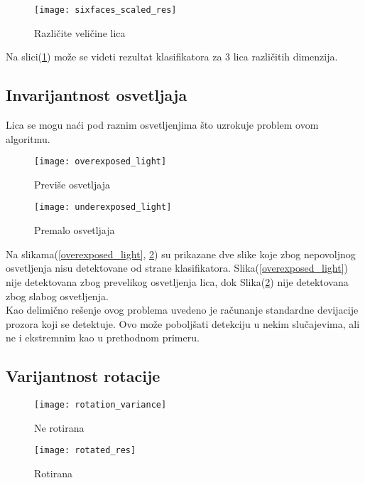 \begin{figure}[h]
  \centering
  \texttt{[image: sixfaces\_scaled\_res]}
  \caption{Različite veličine lica}
  \label{sixfaces_scaled}
\end{figure}

Na slici(\ref{sixfaces_scaled}) može se videti rezultat klasifikatora za 3 lica
različitih dimenzija. \\

\newpage

\subsection{Invarijantnost osvetljaja}\label{lumi_inv_sec}

Lica se mogu naći pod raznim osvetljenjima što uzrokuje problem ovom algoritmu.


\begin{figure}[!htb]
\centering
\parbox{6cm}{
\texttt{[image: overexposed\_light]}
\caption{Previše osvetljaja\cite{CALTECH_DATASET}}
\label{overexposed_light}}
\qquad
\begin{minipage}{6cm}
\texttt{[image: underexposed\_light]}
\caption{Premalo osvetljaja\cite{CALTECH_DATASET}}
\label{underexposed_light}
\end{minipage}
\end{figure}

Na slikama(\ref{overexposed_light}, \ref{underexposed_light}) su prikazane dve
slike koje zbog nepovoljnog osvetljenja nisu detektovane od strane
klasifikatora.
Slika(\ref{overexposed_light}) nije detektovana zbog prevelikog osvetljenja
lica, dok Slika(\ref{underexposed_light}) nije detektovana zbog slabog
osvetljenja.  \\

Kao delimično rešenje ovog problema uvedeno je računanje standardne devijacije
prozora koji se detektuje.
Ovo može poboljšati detekciju u nekim slučajevima, ali ne i ekstremnim kao u
prethodnom primeru.

\subsection{Varijantnost rotacije}

\begin{figure}[!htb]
\centering
\parbox{6cm}{
\texttt{[image: rotation\_variance]}
\caption{Ne rotirana\cite{CALTECH_DATASET}}
\label{rotation_variance}}
\qquad
\begin{minipage}{6cm}
\texttt{[image: rotated\_res]}
\caption{Rotirana\cite{CALTECH_DATASET}}
\label{rotated_res}
\end{minipage}
\end{figure}